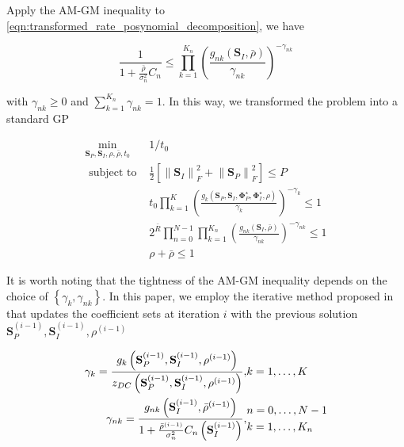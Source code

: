 Apply the AM-GM inequality to \ref{eqn:transformed_rate_posynomial_decomposition}, we have

\begin{equation}\label{eqn:transformed_rate_am_gm}
  \frac{1}{{1 + \frac{{\bar \rho }}{{\sigma _n^2}}{C_n}}} \leqslant \prod\limits_{k = 1}^{{K_n}} {{{\left( {\frac{{{g_{nk}}\left( {{{\mathbf{S}}_I},\bar \rho } \right)}}{{{\gamma _{nk}}}}} \right)}^{ - {\gamma _{nk}}}}}
\end{equation}

with ${\gamma _{nk}} \geqslant 0$ and $\sum\nolimits_{k = 1}^{{K_n}} {{\gamma _{nk}}}  = 1$. In this way, we transformed the problem into a standard GP

\begin{eqnarray}
  {\mathop {\min }\limits_{{{\mathbf{S}}_P},{{\mathbf{S}}_I},\rho ,\bar \rho ,{t_0}} }&{1/{t_0}} \label{eqn:general_target} \\
  {{\text{ subject to }}}&{\frac{1}{2}\left[ {\left\| {{{\mathbf{S}}_I}} \right\|_F^2 + \left\| {{{\mathbf{S}}_P}} \right\|_F^2} \right] \leqslant P} \label{eqn:general_power_constraint} \\
  {}&{{t_0}\prod\limits_{k = 1}^K {{{\left( {\frac{{{g_k}\left( {{{\mathbf{S}}_P},{{\mathbf{S}}_I},{\mathbf{\Phi }}_P^ \star ,{\mathbf{\Phi }}_I^ \star ,\rho } \right)}}{{{\gamma _k}}}} \right)}^{ - {\gamma _k}}}}  \leqslant 1} \label{eqn:general_current_constraint} \\
  {}&{2^{\bar R}}\prod\limits_{n = 0}^{N - 1} {\prod\limits_{k = 1}^{{K_n}} {{{\left( {\frac{{{g_{nk}}\left( {{{\mathbf{S}}_I},\bar \rho } \right)}}{{{\gamma _{nk}}}}} \right)}^{ - {\gamma _{nk}}}}} }  \leqslant 1 \label{eqn:general_rate_constraint} \\
  {}&{\rho  + \bar \rho  \leqslant 1} \label{eqn:general_ratio_constraint}
\end{eqnarray}

It is worth noting that the tightness of the AM-GM inequality depends on the choice of $\left\{ {{\gamma _k},{\gamma _{nk}}} \right\}$. In this paper, we employ the iterative method proposed in \cite{Clerckx2018} that updates the coefficient sets at iteration $i$ with the previous solution ${{\mathbf{S}}_P^{(i - 1)},{\mathbf{S}}_I^{(i - 1)},{\rho ^{(i - 1)}}}$

\begin{eqnarray}
  {{\gamma _k} = \frac{{{g_k}\left( {{\mathbf{S}}_P^{(i - 1)},{\mathbf{S}}_I^{(i - 1)},{\rho ^{(i - 1)}}} \right)}}{{{z_{DC}}\left( {{\mathbf{S}}_P^{(i - 1)},{\mathbf{S}}_I^{(i - 1)},{\rho ^{(i - 1)}}} \right)}},}&{k = 1, \ldots ,K} \\
  {{\gamma _{nk}} = \frac{{{g_{nk}}\left( {{\mathbf{S}}_I^{(i - 1)},{{\bar \rho }^{(i - 1)}}} \right)}}{{1 + \frac{{{{\bar \rho }^{(i - 1)}}}}{{\sigma _n^2}}{C_n}\left( {{\mathbf{S}}_I^{(i - 1)}} \right)}},}&\begin{gathered}
  n = 0, \ldots ,N - 1 \hfill \\
  k = 1, \ldots ,{K_n} \hfill \\
\end{gathered}
\end{eqnarray}

